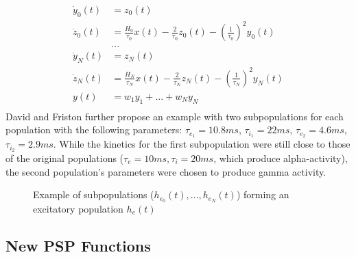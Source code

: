 \begin{equation}
    \begin{aligned}
        \dot{y}_0(t) &= z_0(t) \\
        \dot{z}_0(t) &= \frac{H_0}{\tau_0} x(t) - \frac{2}{\tau_0}z_0(t) - \left(\frac{1}{\tau_0}\right)^2y_0(t)\\
        &...\\
        \dot{y}_N(t) &= z_N(t) \\
        \dot{z}_N(t) &= \frac{H_N}{\tau_N} x(t) - \frac{2}{\tau_N}z_N(t) - \left(\frac{1}{\tau_N}\right)^2y_N(t)\\
        y(t)         &= w_1y_1 + ... + w_Ny_N\\
    \end{aligned}\label{eq:davidfriston_subpops}
\end{equation}
David and Friston further propose an example with two subpopulations for each population with the following parameters: $\tau_{e_1}=10.8ms$, $\tau_{i_1}=22ms$, $\tau_{e_2}=4.6ms$, $\tau_{i_2}=2.9ms$. While the kinetics for the first subpopulation were still close to those of the original populations ($\tau_e=10ms, \tau_i=20ms$, which produce alpha-activity), the second population's parameters were chosen to produce gamma activity.


\begin{figure}[H]
    
    \caption{Example of subpopulations ($h_{e_0}(t), ..., h_{e_N}(t)$) forming an excitatory population $h_e(t)$}
    \label{fig:exc_subpops}
\end{figure}
%

\subsection{New PSP Functions}\label{subsec:new-psp-functions}

